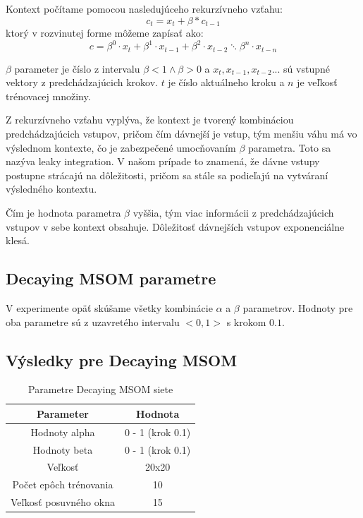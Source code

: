 Kontext počítame pomocou nasledujúceho rekurzívneho vzťahu:
\begin{equation}
    c_{t} = x_{t} + \beta * c_{t-1}
\end{equation}
ktorý v rozvinutej forme môžeme zapísať ako:
\begin{equation}
	c = \beta^{0} \cdot x_{t} + \beta^{1} \cdot x_{t-1} + 
	\beta^{2} \cdot x_{t-2} \ddots \beta^{n} \cdot x_{t-n}
\end{equation}

$\beta$ parameter je číslo z intervalu $\beta < 1 \wedge \beta > 0$ a
$x_t, x_{t-1}, x_{t-2} ...$ sú vstupné vektory z predchádzajúcich krokov.
$t$ je číslo aktuálneho kroku a $n$ je veľkosť trénovacej množiny.

Z rekurzívneho vzťahu vyplýva, že kontext je tvorený kombináciou predchádzajúcich vstupov,
pričom čím dávnejší je vstup, tým menšiu váhu má vo výslednom kontexte, čo je zabezpečené umocňovaním
$\beta$ parametra. Toto sa nazýva leaky integration. V našom prípade
to znamená, že dávne vstupy postupne strácajú na dôležitosti, pričom sa stále sa podieľajú 
na vytváraní výsledného kontextu.

Čím je hodnota parametra $\beta$ vyššia, tým viac informácii z predchádzajúcich vstupov v sebe
kontext obsahuje. Dôležitosť dávnejších vstupov exponenciálne klesá.

\subsection{Decaying MSOM parametre}
V experimente opäť skúšame všetky kombinácie $\alpha$ a $\beta$ parametrov.
Hodnoty pre oba parametre sú z uzavretého intervalu $<0, 1>$ s krokom $0.1$.

\subsection{Výsledky pre Decaying MSOM}
\begin{table}[h!]
    \centering
    \begin{tabular}{|c|c|} 
     \hline
     Parameter & Hodnota \\ 
     \hline\hline
     Hodnoty alpha & 0 - 1 (krok 0.1)  \\ 
     \hline
     Hodnoty beta & 0 - 1  (krok 0.1) \\ 
     \hline
     Veľkosť & 20x20  \\
     \hline
     Počet epôch trénovania & 10  \\
     \hline
     Veľkosť posuvného okna & 15 \\
     \hline
    \end{tabular}
    \caption{Parametre Decaying MSOM siete}
    \label{table:1}
    \end{table}
    
